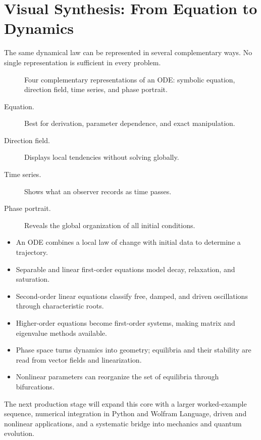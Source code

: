 \section{Visual Synthesis: From Equation to Dynamics}
\label{sec:ch4-visual-synthesis}

The same dynamical law can be represented in several complementary ways. No single representation is sufficient in every problem.

\begin{figure}[htbp]
\centering

\caption{Four complementary representations of an ODE: symbolic equation, direction field, time series, and phase portrait.}
\label{fig:ch4-representation-map}
\end{figure}

\begin{description}
\item[Equation.] Best for derivation, parameter dependence, and exact manipulation.
\item[Direction field.] Displays local tendencies without solving globally.
\item[Time series.] Shows what an observer records as time passes.
\item[Phase portrait.] Reveals the global organization of all initial conditions.
\end{description}

\begin{summarybox}
\begin{itemize}
\item An ODE combines a local law of change with initial data to determine a trajectory.
\item Separable and linear first-order equations model decay, relaxation, and saturation.
\item Second-order linear equations classify free, damped, and driven oscillations through characteristic roots.
\item Higher-order equations become first-order systems, making matrix and eigenvalue methods available.
\item Phase space turns dynamics into geometry; equilibria and their stability are read from vector fields and linearization.
\item Nonlinear parameters can reorganize the set of equilibria through bifurcations.
\end{itemize}
\end{summarybox}

\begin{lookingaheadbox}
The next production stage will expand this core with a larger worked-example sequence, numerical integration in Python and Wolfram Language, driven and nonlinear applications, and a systematic bridge into mechanics and quantum evolution.
\end{lookingaheadbox}
